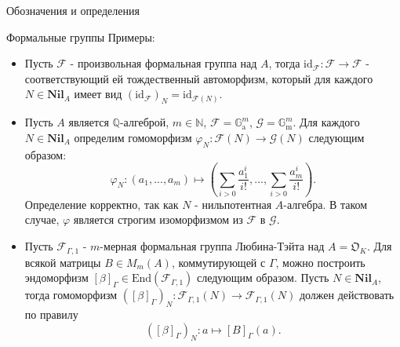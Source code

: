 \documentclass[a4paper,14pt]{extarticle}
\theoremstyle{definition}
\newcommand{\id}{\mathrm{id}}
\newcommand{\End}[1]{\mathrm{End}\left(#1\right)}
\newcommand{\Nil}[1]{\mathbf{Nil}_{#1}}
\newcommand{\bG}{\mathbb{G}}
\newcommand{\bN}{\mathbb{N}}
\newcommand{\bQ}{\mathbb{Q}}
\newcommand{\fO}{\mathfrak{O}}
\newcommand{\sF}{\mathscr{F}}
\newcommand{\sG}{\mathscr{G}}
\newcommand{\Ga}{\bG_{\mathrm{a}}}
\newcommand{\Gm}{\bG_{\mathrm{m}}}
\begin{document}
\begin{section}{Обозначения и определения}
\begin{subsection}{Формальные группы}
Примеры:
\begin{itemize}
    \item Пусть $\sF$ - произвольная формальная группа над $A$, тогда ${ \id_\sF : \sF \rightarrow \sF }$ - соответствующий ей тождественный автоморфизм, который для каждого ${ N \in \Nil{A} }$ имеет вид ${ (\id_\sF)_N = \id_{\sF(N)} }$.
    \item Пусть $A$ является $\bQ$-алгеброй, ${ m \in \bN }$, ${ \sF = \Ga^m }$, ${ \sG = \Gm^m }$. Для каждого ${ N \in \Nil{A} }$ определим гомоморфизм ${ \varphi_N : \sF(N) \rightarrow \sG(N) }$ следующим образом:
    \begin{equation*}
        \varphi_N :
        (a_1, ..., a_m) \mapsto
        \left(
            \sum_{i > 0} \frac{a_1^i}{i!},
            ...,
            \sum_{i > 0} \frac{a_m^i}{i!}
        \right).
    \end{equation*}
    Определение корректно, так как $N$ - нильпотентная $A$-алгебра. В таком случае, $\varphi$ является строгим изоморфизмом из $\sF$ в $\sG$.
    \item Пусть $\sF_{\Gamma, 1}$ - $m$-мерная формальная группа Любина-Тэйта над ${ A = \fO_K }$. Для всякой матрицы ${ B \in M_m(A) }$, коммутирующей с $\Gamma$, можно построить эндоморфизм ${ [\beta]_\Gamma \in \End{\sF_{\Gamma, 1}} }$ следующим образом. Пусть ${ N \in \Nil{A} }$, тогда гомоморфизм $ \left( [\beta]_\Gamma \right)_N : \sF_{\Gamma, 1}(N) \rightarrow \sF_{\Gamma, 1}(N) $ должен действовать по правилу
    \begin{equation*}
        \left( [\beta]_\Gamma \right)_N :
        a \mapsto
        [B]_\Gamma(a).
    \end{equation*}
\end{itemize}


\end{subsection}
\end{section}
\end{document}
